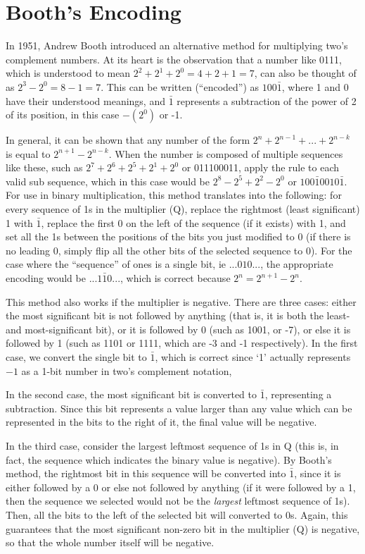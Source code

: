 \documentclass{article}
\begin{document}
\section{Booth's Encoding}
In 1951, Andrew Booth introduced an alternative method for multiplying two's complement numbers.
At its heart is the observation that a number like 0111, which is understood to mean $2^2 + 2^1 + 2^0 = 4 + 2 + 1 = 7$, can also be thought of as $2^3 - 2^0 = 8 - 1 = 7$.
This can be written (``encoded'') as $100\bar{1}$, where 1 and 0 have their understood meanings, and $\bar{1}$ represents a subtraction of the power of 2 of its position, in this case $-(2^0)$ or -1.

    In general, it can be shown that any number of the form $2^n + 2^{n-1} + ...
+ 2^{n-k}$ is equal to $2^{n+1} - 2^{n-k}$.
When the number is composed of multiple sequences like these, such as $2^7 + 2^6 + 2^5 + 2^1 + 2^0$ or 011100011, apply the rule to each valid sub sequence, which in this case would be $2^8 - 2^5 + 2^2 - 2^0$ or $100\bar{1}0010\bar{1}$.
For use in binary multiplication, this method translates into the following: for every sequence of 1s in the multiplier (Q), replace the rightmost (least significant) 1 with $\bar{1}$, replace the first 0 on the left of the sequence (if it exists) with 1, and set all the 1s between the positions of the bits you just modified to 0 (if there is no leading 0, simply flip all the other bits of the selected sequence to 0).
For the case where the ``sequence'' of ones is a single bit, ie $...010...$,
the appropriate encoding would be $...1\bar{1}0...$,
which is correct because $2^n = 2^{n+1} - 2^n$.

This method also works if the multiplier is negative.
There are three cases: either the most significant bit is not followed by anything (that is, it is both the least- and most-significant bit), or it is followed by 0 (such as 1001, or -7), or else it is followed by 1 (such as 1101 or 1111, which are -3 and -1 respectively).
In the first case, we convert the single bit to $\bar{1}$, which is correct since `1' actually represents $-1$ as a 1-bit number in two's complement notation, 

In the second case, the most significant bit is converted to $\bar{1}$, representing a subtraction.
Since this bit represents a value larger than any value which can be represented in the bits to the right of it, the final value will be negative.

In the third case, consider the largest leftmost sequence of 1s in Q (this is, in fact, the sequence which indicates the binary value is negative).
By Booth's method, the rightmost bit in this sequence will be converted into $\bar{1}$, since it is either followed by a 0 or else not followed by anything (if it were followed by a 1, then the sequence we selected would not be the \emph{largest} leftmost sequence of 1s).
Then, all the bits to the left of the selected bit will converted to 0s.
Again, this guarantees that the most significant non-zero bit in the multiplier (Q) is negative, so that the whole number itself will be negative.
\end{document}

